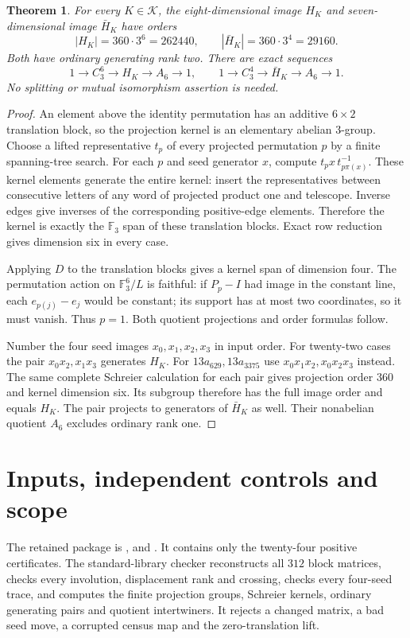 \documentclass[11pt]{article}
\newtheorem{theorem}[lemma]{Theorem}
\newcommand{\F}{\mathbb F}
\begin{document}
\begin{theorem}\label{thm:groups}
For every $K\in\mathcal K$, the eight-dimensional image $H_K$ and
seven-dimensional image $\bar H_K$ have orders
\[
 |H_K|=360\cdot3^6=262440,\qquad
 |\bar H_K|=360\cdot3^4=29160.
\]
Both have ordinary generating rank two. There are exact sequences
\[
 1\longrightarrow C_3^6\longrightarrow H_K\longrightarrow A_6\longrightarrow1,
 \qquad
 1\longrightarrow C_3^4\longrightarrow\bar H_K\longrightarrow A_6\longrightarrow1.
\]
No splitting or mutual isomorphism assertion is needed.
\end{theorem}
\begin{proof}
An element above the identity permutation has an additive
$6\times2$ translation block, so the projection kernel is an
elementary abelian $3$-group. Choose a lifted representative $t_p$
of every projected permutation $p$ by a finite spanning-tree search.
For each $p$ and seed generator $x$, compute
$t_px\,t_{p\pi(x)}^{-1}$. These kernel elements generate the entire
kernel: insert the representatives between consecutive letters of
any word of projected product one and telescope. Inverse edges give
inverses of the corresponding positive-edge elements.
Therefore the kernel is exactly the $\F_3$ span of these translation
blocks. Exact row reduction gives dimension six in every case.

Applying $D$ to the translation blocks gives a kernel span of
dimension four. The permutation action on $\F_3^6/L$ is faithful:
if $P_p-I$ had image in the constant line, each $e_{p(j)}-e_j$
would be constant; its support has at most two coordinates, so it
must vanish. Thus $p=1$. Both quotient projections and order
formulas follow.

Number the four seed images $x_0,x_1,x_2,x_3$ in input order.
For twenty-two cases the pair $x_0x_2,x_1x_3$ generates $H_K$.
For $13a_{629},13a_{3375}$ use $x_0x_1x_2,x_0x_2x_3$ instead.
The same complete Schreier calculation for each pair gives
projection order $360$ and kernel dimension six. Its subgroup
therefore has the full image order and equals $H_K$.
The pair projects to generators of $\bar H_K$ as well.
Their nonabelian quotient $A_6$ excludes ordinary rank one.
\end{proof}

\section{Inputs, independent controls and scope}

The retained package is ,
 and
. It contains only the twenty-four
positive certificates. The standard-library checker reconstructs
all $312$ block matrices, checks every involution, displacement rank
and crossing, checks every four-seed trace, and computes the finite
projection groups, Schreier kernels, ordinary generating pairs and
quotient intertwiners. It rejects a changed matrix, a bad seed move,
a corrupted census map and the zero-translation lift.
\end{document}

